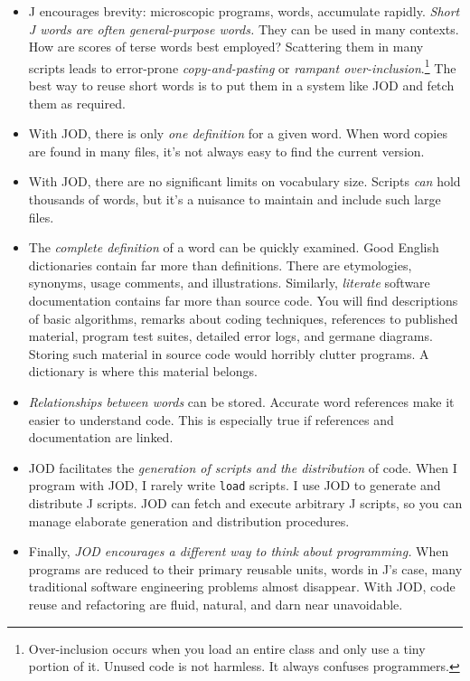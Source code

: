 \begin{itemize}
	\item J encourages brevity: microscopic programs, words, accumulate rapidly.  
	\emph{Short J words are often general-purpose words. } They can be used in many contexts.  How  
	are scores of terse words best employed? Scattering them in many scripts leads
	to error-prone \emph{copy-and-pasting} or 
	 \emph{rampant over-inclusion}.\footnote{Over-inclusion occurs when you load 
	an entire class and only use a tiny portion of it.  Unused code is not harmless. It always confuses programmers.}  
	 The best way to reuse short words is to put
	 them in a system like JOD and fetch them as required.   
	\item With JOD, there is only \emph{one definition} for a given word. When word copies are
	 found in many files, it's not always easy to find the current version.
	\item With JOD, there are no significant limits on vocabulary size.  Scripts \emph{can} hold thousands
	of words, but it's a nuisance to maintain and include such large files.
	\item The \emph{complete definition} of a word can 
	be quickly examined.  Good English dictionaries contain far more than
	definitions.  There are etymologies, synonyms, usage comments, and illustrations.  Similarly,
	\emph{literate} software documentation contains far more than source code.  You will find
	descriptions of basic algorithms, remarks about coding techniques, references to
	published material, program test suites, detailed error
	logs, and germane diagrams. Storing such material in source code would 
	horribly clutter programs.  A dictionary is where this material belongs.
	\item \emph{Relationships between words} can be stored.  Accurate word references
	 make it easier to understand code.  This is especially true if references 
	  and documentation are linked. 
	\item JOD facilitates the \emph{generation of scripts and the distribution} of code. When I
	program with JOD, I rarely write \texttt{load} scripts.  I use JOD to generate and distribute
  J scripts.  JOD can fetch and execute arbitrary J scripts, so you can manage
  elaborate generation and distribution procedures.
   \item Finally, \emph{JOD encourages a different way to think about programming.} When programs are
   reduced to their primary reusable units, words in J's case, many traditional software engineering problems
   almost disappear. With JOD, code reuse and refactoring are fluid, natural, and darn near unavoidable.
\end{itemize}

